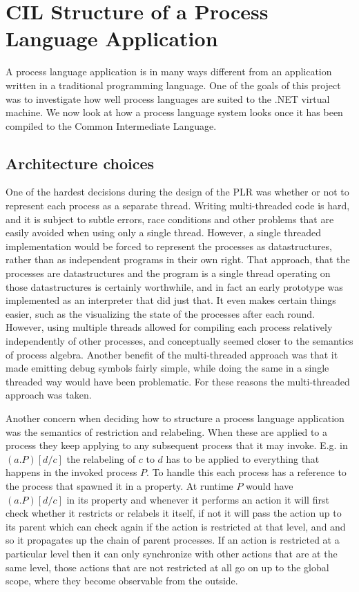 \section{CIL Structure of a Process Language Application}\label{cil_structure}

	A process language application is in many ways different from an application
	written in a traditional programming language. One of the goals of this  
	project was to investigate how well process languages are suited to the .NET
	virtual machine. We now look at how a process language system looks once it 
	has been compiled to the Common Intermediate Language.
	
	\subsection{Architecture choices}\label{sec:cil_architecture}
	One of the hardest decisions during the design of the PLR was whether or not 
	to represent each process as a separate thread. Writing multi-threaded code 
	is hard, and it is subject to subtle errors, race conditions and other 
	problems that are easily avoided when using only a single thread. However, a 
	single threaded implementation would be forced to represent the processes as 
	datastructures, rather than as independent programs in their own right. 
	That approach, that the processes are datastructures and the program is a 
	single thread operating on those datastructures is certainly worthwhile, and 
	in fact an early prototype was implemented as an interpreter that did just 
	that. It even makes certain things easier, such as the visualizing the state 
	of the processes after each round. However, using multiple threads allowed 
	for compiling each process relatively independently of other processes, and 
	conceptually seemed closer to the semantics of process algebra. Another
	benefit of the multi-threaded approach was that it made emitting debug 
	symbols fairly simple, while doing the same in a single threaded way would 
	have been problematic. For these reasons the multi-threaded approach was 
	taken.
	
	Another concern when deciding how to structure a process language 
	application was the semantics of restriction and relabeling. When these are 
	applied to a process they keep applying to any subsequent process that it 
	may invoke. E.g. in $(a . P)[d/c]$ the relabeling of $c$ to $d$ has to be 
	applied to everything that happens in the invoked process $P$. To handle 
	this each process has a reference to the process that spawned it in a 
	 property. At runtime $P$ would have $(a . P)[d/c]$ in its 
	 property and whenever it performs an action it will first 
	check whether it restricts or relabels it itself, if not it will pass the 
	action up to its parent which can check again if the action is restricted at 
	that level, and and so it propagates up the chain of parent processes. If an 
	action is restricted at a particular level then it can only synchronize with 
	other actions that are at the same level, those actions that are not 
	restricted at all go on up to the global scope, where they become observable 
	from the outside.
	
